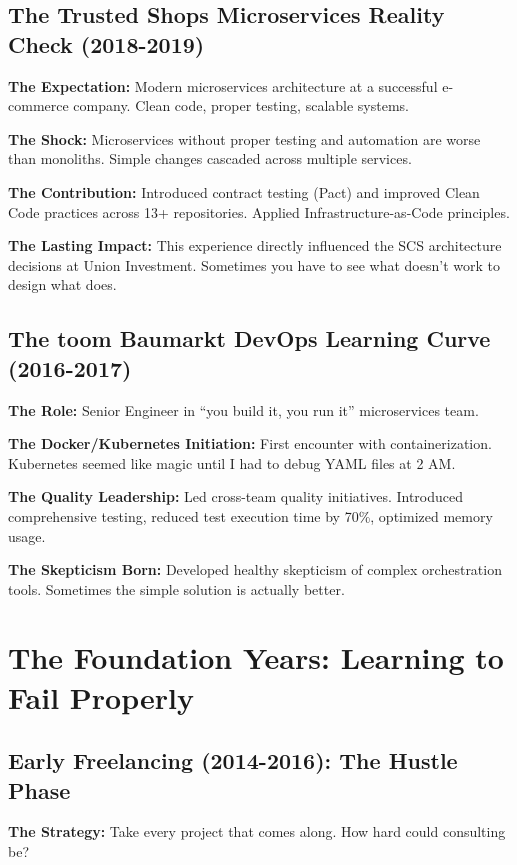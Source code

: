 \documentclass[11pt,a4paper]{article}
\begin{document}
\subsection{The Trusted Shops Microservices Reality Check (2018-2019)}
\textbf{The Expectation:} Modern microservices architecture at a successful e-commerce company. Clean code, proper testing, scalable systems.

\textbf{The Shock:} Microservices without proper testing and automation are worse than monoliths. Simple changes cascaded across multiple services.

\textbf{The Contribution:} Introduced contract testing (Pact) and improved Clean Code practices across 13+ repositories. Applied Infrastructure-as-Code principles.

\textbf{The Lasting Impact:} This experience directly influenced the SCS architecture decisions at Union Investment. Sometimes you have to see what doesn't work to design what does.

\subsection{The toom Baumarkt DevOps Learning Curve (2016-2017)}
\textbf{The Role:} Senior Engineer in ``you build it, you run it'' microservices team.

\textbf{The Docker/Kubernetes Initiation:} First encounter with containerization. Kubernetes seemed like magic until I had to debug YAML files at 2 AM.

\textbf{The Quality Leadership:} Led cross-team quality initiatives. Introduced comprehensive testing, reduced test execution time by 70\%, optimized memory usage.

\textbf{The Skepticism Born:} Developed healthy skepticism of complex orchestration tools. Sometimes the simple solution is actually better.

\newpage

\section{The Foundation Years: Learning to Fail Properly}

\subsection{Early Freelancing (2014-2016): The Hustle Phase}
\textbf{The Strategy:} Take every project that comes along. How hard could consulting be?
\end{document}

